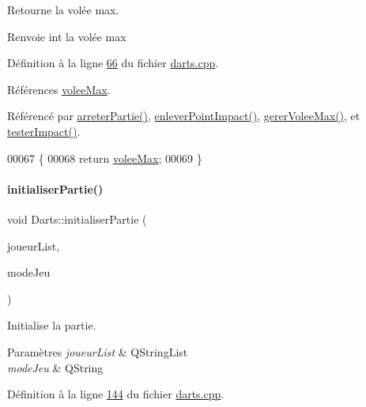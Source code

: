 Retourne la volée max. 

\begin{DoxyReturn}{Renvoie}
int la volée max 
\end{DoxyReturn}


Définition à la ligne \hyperlink{darts_8cpp_source_l00066}{66} du fichier \hyperlink{darts_8cpp_source}{darts.\+cpp}.



Références \hyperlink{darts_8h_source_l00079}{volee\+Max}.



Référencé par \hyperlink{darts_8cpp_source_l00422}{arreter\+Partie()}, \hyperlink{darts_8cpp_source_l00274}{enlever\+Point\+Impact()}, \hyperlink{darts_8cpp_source_l00409}{gerer\+Volee\+Max()}, et \hyperlink{darts_8cpp_source_l00246}{tester\+Impact()}.


\begin{DoxyCode}
00067 \{
00068     \textcolor{keywordflow}{return} \hyperlink{class_darts_aed9c6aa8f34fb2dcbc57a5ea24aa6c2a}{voleeMax};
00069 \}
\end{DoxyCode}
\mbox{\label{class_darts_ac7000897b8d394c3be39804813a39dc8}} 
\paragraph{\texorpdfstring{initialiser\+Partie()}{initialiserPartie()}}
{\footnotesize\ttfamily void Darts\+::initialiser\+Partie (\begin{DoxyParamCaption}\item[{Q\+String\+List}]{joueur\+List,  }\item[{Q\+String}]{mode\+Jeu }\end{DoxyParamCaption})}



Initialise la partie. 


\begin{DoxyParams}{Paramètres}
{\em joueur\+List} & Q\+String\+List \\
\hline
{\em mode\+Jeu} & Q\+String \\
\hline
\end{DoxyParams}


Définition à la ligne \hyperlink{darts_8cpp_source_l00144}{144} du fichier \hyperlink{darts_8cpp_source}{darts.\+cpp}.



